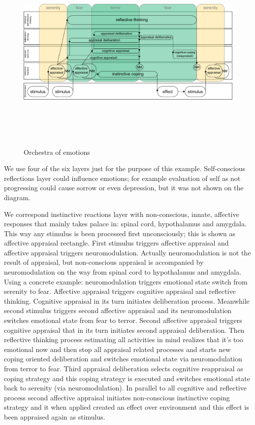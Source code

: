 \begin{figure}
\begin{center}
 \includegraphics[height=10cm]{figure2_orchestra_of_emotions}
\end{center}
\caption{Orchestra of emotions}
\end{figure}

We use four of the six layers just for the purpose of this example. Self-conscious reflections layer could influence emotions; for example evaluation of self as not progressing could cause sorrow or even depression, but it was not shown on the diagram.

We correspond instinctive reactions layer with non-conscious, innate, affective responses that mainly takes palace in: spinal cord, hypothalamus and amygdala. This way any stimulus is been processed first unconsciously; this is shown as affective appraisal rectangle. First stimulus triggers affective appraisal and affective appraisal triggers neuromodulation. Actually neuromodulation is not the result of appraisal, but non-conscious appraisal is accompanied by neuromodulation on the way from spinal cord to hypothalamus and amygdala.
Using a concrete example: neuromodulation triggers emotional state switch from serenity to fear. Affective appraisal triggers cognitive appraisal and reflective thinking. Cognitive appraisal in its turn initiates deliberation process. Meanwhile second stimulus triggers second affective appraisal and its neuromodulation switches emotional state from fear to terror. Second affective appraisal triggers cognitive appraisal that in its turn initiates second appraisal deliberation. Then reflective thinking process estimating all activities in mind realizes that it's too emotional now and then stop all appraisal related processes and starts new coping oriented deliberation and switches emotional state via neuromodulation from terror to fear. Third appraisal deliberation selects cognitive reappraisal as coping strategy and this coping strategy is executed and switches emotional state back to serenity (via neuromodulation).
In parallel to all cognitive and reflective process second affective appraisal initiates non-conscious instinctive coping strategy and it when applied created an effect over environment and this effect is been appraised again as stimulus.

